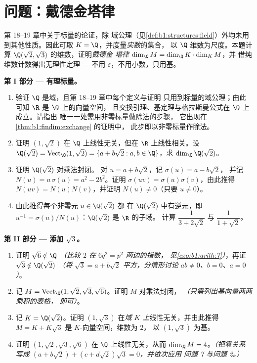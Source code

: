\section{问题：戴德金塔律}

\begin{problem}\label{pb:b1:findim:1}
第 18--19 章中关于标量的论证，除
域公理（见\cref{def:b1:structures:field}）外均未用到其他性质。因此可取
$K = \Q$，并度量\emph{实数}的集合，
以 $\Q$ 维数为尺度。本题计算
$\Q(\sqrt2, \sqrt3)$ 的维数，证明\emph{戴德金
塔律} $\dim_\Q M = \dim_\Q K \cdot \dim_K M$，并
借纯维数计数得出无理性定理 --- 不用
$\varepsilon$，不用小数，只用基。

\medskip
\noindent\textbf{第 I 部分 --- 有理标量。}
\begin{enumerate}
  \item 验证 $\Q$ 是域，且第 18--19 章中每个定义与证明
        只用到标量的域公理；由此可知 $\R$ 是 $\Q$ 上的向量空间，
        且交换引理、基定理与格拉斯曼公式在 $\Q$ 上成立。请指出
        唯一一处需用非零标量做除法的步骤，
        它出现在
        \cref{thm:b1:findim:exchange} 的证明中，
        此步即以非零标量作除法。
  \item 证明 $(1, \sqrt2)$ 在 $\Q$ 上线性无关，但在
        $\R$ 上线性相关。设 $\Q(\sqrt2) = \operatorname{Vect}_\Q(1,
        \sqrt2) = \{a + b\sqrt2 : a, b \in \Q\}$，求
        $\dim_\Q \Q(\sqrt2)$。
  \item 证明 $\Q(\sqrt2)$ 对乘法封闭。
        对 $u = a + b\sqrt2$，记 $\sigma(u) = a - b\sqrt2$，
        并记 $N(u) = u\,\sigma(u) = a^2 - 2b^2$。证明 $\sigma(uv) =
        \sigma(u)\sigma(v)$，由此推得 $N(uv) = N(u)N(v)$，并证明
        $N(u) \neq 0$（只要 $u \neq 0$）。
  \item 由此推得每个非零元 $u \in \Q(\sqrt2)$ 都
        在 $\Q(\sqrt2)$ 中有逆元，即 $u^{-1} =
        \sigma(u)/N(u)$：$\Q(\sqrt2)$ 是 $\R$ 的子域。
        计算 $\dfrac1{3 + 2\sqrt2}$ 与 $\dfrac1{1 + \sqrt2}$。
\end{enumerate}

\medskip
\noindent\textbf{第 II 部分 --- 添加 $\sqrt3$。}
\begin{enumerate}[resume]
  \item 证明 $\sqrt6 \notin \Q$ \emph{（比较 $2$ 在
        $6q^2 = p^2$ 两边的指数，
        见\cref{exo:b1:arith:7}）}，再证 $\sqrt3 \notin
        \Q(\sqrt2)$ \emph{（将 $\sqrt3 = a + b\sqrt2$ 平方，分情形讨论
        $ab \neq 0$、$b = 0$、$a = 0$）}。
  \item 记 $M = \operatorname{Vect}_\Q(1, \sqrt2, \sqrt3,
        \sqrt6)$。证明 $M$ 对乘法封闭，
        \emph{（只需列出基向量两两乘积的表格，
        即可）}。
  \item 记 $K = \Q(\sqrt2)$。证明 $(1, \sqrt3)$
        在\emph{域 $K$ 上}线性无关，并由此推得 $M = K +
        K\sqrt3$ 是 $K$-向量空间，维数为 $2$，
        以 $(1, \sqrt3)$ 为基。
  \item 证明 $(1, \sqrt2, \sqrt3, \sqrt6)$ 在
        $\Q$ 上线性无关，从而 $\dim_\Q M = 4$。\emph{（把零关系
        写成 $(a + b\sqrt2) + (c + d\sqrt2)\sqrt3 = 0$，并依次应用
        问题 7 与问题 2。）}
\end{enumerate}


\end{problem}
